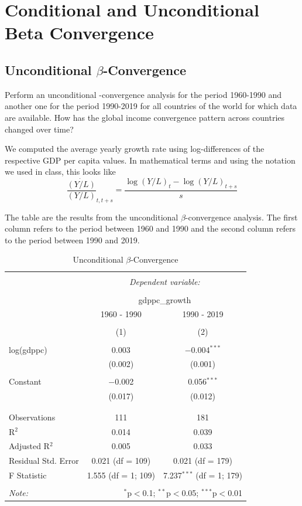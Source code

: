 \documentclass[a4paper,11pt]{article}
\begin{document}
\section{Conditional and Unconditional Beta Convergence}
\begin{qbox}{\subsection{Unconditional $\beta$-Convergence}}
Perform an unconditional -convergence analysis for the period 1960-1990 and another one for the period 1990-2019 for all countries of the world for which data are available. How has the global income convergence pattern across countries changed over time?
\end{qbox}

We computed the average yearly growth rate using log-differences of the respective GDP per capita values. In mathematical terms and using the notation we used in class, this looks like
$$\frac{\dot{\left(Y/L \right)}}{\left(Y/L \right)}_{t,t+s} = \frac{\log(Y/L)_{t}-\log(Y/L)_{t+s}}{s}$$

The table are the results from the unconditional $\beta$-convergence analysis. The first column refers to the period between 1960 and 1990 and the second column refers to the period between 1990 and 2019. 
\begin{table}[!htbp] \centering 
  \caption{Unconditional $\beta$-Convergence} 
  \label{} 
\begin{tabular}{@{\extracolsep{5pt}}lcc} 
\\[-1.8ex]\hline 
\hline \\[-1.8ex] 
 & \multicolumn{2}{c}{\textit{Dependent variable:}} \\ 
\cline{2-3} 
\\[-1.8ex] & \multicolumn{2}{c}{gdppc\_growth} \\ 
 & 1960 - 1990 & 1990 - 2019 \\ 
\\[-1.8ex] & (1) & (2)\\ 
\hline \\[-1.8ex] 
 log(gdppc) & 0.003 & $-$0.004$^{***}$ \\ 
  & (0.002) & (0.001) \\ 
  & & \\ 
 Constant & $-$0.002 & 0.056$^{***}$ \\ 
  & (0.017) & (0.012) \\ 
  & & \\ 
\hline \\[-1.8ex] 
Observations & 111 & 181 \\ 
R$^{2}$ & 0.014 & 0.039 \\ 
Adjusted R$^{2}$ & 0.005 & 0.033 \\ 
Residual Std. Error & 0.021 (df = 109) & 0.021 (df = 179) \\ 
F Statistic & 1.555 (df = 1; 109) & 7.237$^{***}$ (df = 1; 179) \\ 
\hline 
\hline \\[-1.8ex] 
\textit{Note:}  & \multicolumn{2}{r}{$^{*}$p$<$0.1; $^{**}$p$<$0.05; $^{***}$p$<$0.01} \\ 
\end{tabular} 
\end{table} 
\end{document}
